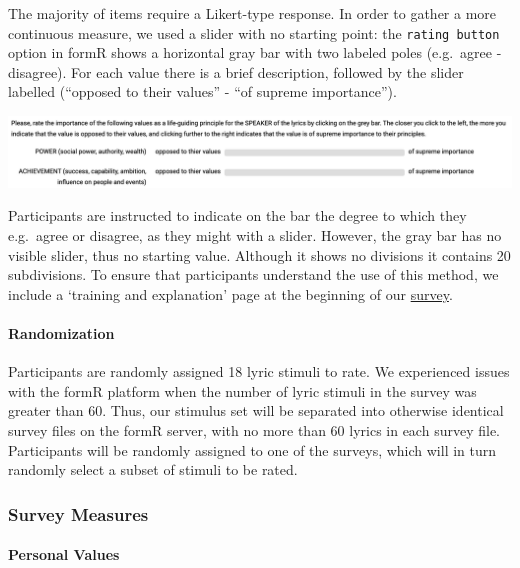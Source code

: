 \documentclass[
  letterpaper,
  DIV=11,
  numbers=noendperiod]{scrartcl}
\let\oldparagraph\paragraph
\renewcommand{\paragraph}[1]{\oldparagraph{#1}\mbox{}}
\begin{document}
The majority of items require a Likert-type response. In order to gather
a more continuous measure, we used a slider with no starting point: the
\texttt{rating\ button} option in formR shows a horizontal gray bar with
two labeled poles (e.g.~agree - disagree). For each value there is a
brief description, followed by the slider labelled (``opposed to their
values'' - ``of supreme importance'').

\includegraphics{screenshots/formR.png}

Participants are instructed to indicate on the bar the degree to which
they e.g.~agree or disagree, as they might with a slider. However, the
gray bar has no visible slider, thus no starting value. Although it
shows no divisions it contains 20 subdivisions. To ensure that
participants understand the use of this method, we include a `training
and explanation' page at the beginning of our
\href{https://testmysurvey.formr.org/}{survey}.

\hypertarget{randomization}{%
\paragraph{Randomization}\label{randomization}}

Participants are randomly assigned 18 lyric stimuli to rate. We
experienced issues with the formR platform when the number of lyric
stimuli in the survey was greater than 60. Thus, our stimulus set will
be separated into otherwise identical survey files on the formR server,
with no more than 60 lyrics in each survey file. Participants will be
randomly assigned to one of the surveys, which will in turn randomly
select a subset of stimuli to be rated.

\hypertarget{survey-measures}{%
\subsubsection{Survey Measures}\label{survey-measures}}

\hypertarget{personal-values}{%
\paragraph{Personal Values}\label{personal-values}}
\end{document}
